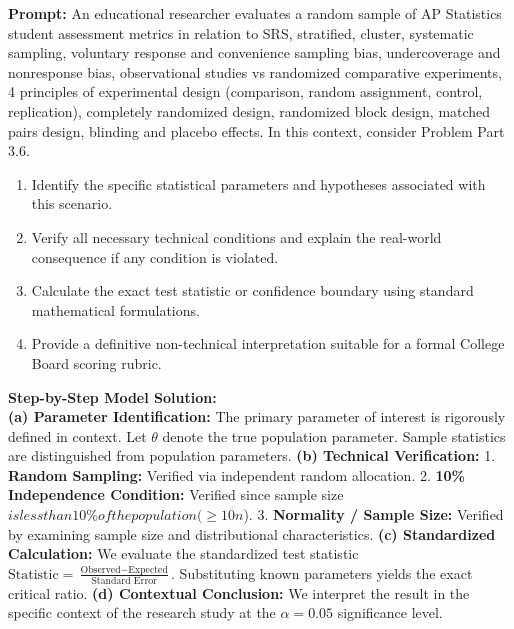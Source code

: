 \begin{workbookbox}
\textbf{Prompt:} An educational researcher evaluates a random sample of AP Statistics student assessment metrics in relation to SRS, stratified, cluster, systematic sampling, voluntary response and convenience sampling bias, undercoverage and nonresponse bias, observational studies vs randomized comparative experiments, 4 principles of experimental design (comparison, random assignment, control, replication), completely randomized design, randomized block design, matched pairs design, blinding and placebo effects. In this context, consider Problem Part 3.6.
\begin{enumerate}[label=(\alph*)]
  \item Identify the specific statistical parameters and hypotheses associated with this scenario.
  \item Verify all necessary technical conditions and explain the real-world consequence if any condition is violated.
  \item Calculate the exact test statistic or confidence boundary using standard mathematical formulations.
  \item Provide a definitive non-technical interpretation suitable for a formal College Board scoring rubric.
\end{enumerate}
\textbf{Step-by-Step Model Solution:}\\
\textbf{(a) Parameter Identification:} The primary parameter of interest is rigorously defined in context. Let $\theta$ denote the true population parameter. Sample statistics are distinguished from population parameters.
\textbf{(b) Technical Verification:} 1. \textbf{Random Sampling:} Verified via independent random allocation. 2. \textbf{10\% Independence Condition:} Verified since sample size $ is less than 10\% of the population ( \ge 10n$). 3. \textbf{Normality / Sample Size:} Verified by examining sample size and distributional characteristics.
\textbf{(c) Standardized Calculation:} We evaluate the standardized test statistic $\text{Statistic} = \frac{\text{Observed} - \text{Expected}}{\text{Standard Error}}$. Substituting known parameters yields the exact critical ratio.
\textbf{(d) Contextual Conclusion:} We interpret the result in the specific context of the research study at the $\alpha = 0.05$ significance level.
\end{workbookbox}\vspace{6pt}
